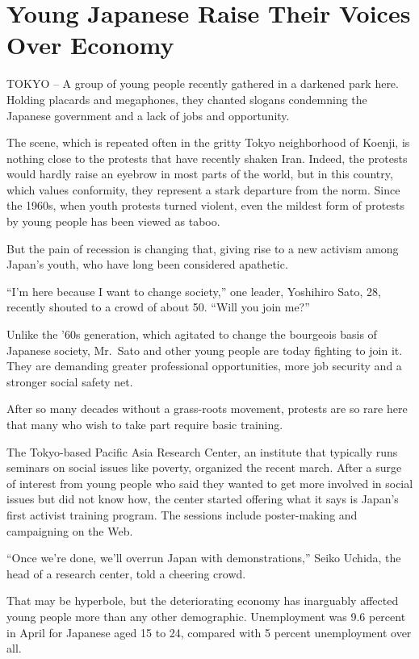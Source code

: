 ﻿\documentclass[12pt]{article}
\begin{document}
\section{Young Japanese Raise Their Voices Over Economy}

TOKYO -- A group of young people recently gathered in a darkened park here. Holding placards and
megaphones, they chanted slogans condemning the Japanese government and a lack of jobs and
opportunity.

The scene, which is repeated often in the gritty Tokyo neighborhood of Koenji, is nothing close to
the protests that have recently shaken Iran. Indeed, the protests would hardly raise an eyebrow in
most parts of the world, but in this country, which values conformity, they represent a stark
departure from the norm. Since the 1960s, when youth protests turned violent, even the mildest form
of protests by young people has been viewed as taboo.

But the pain of recession is changing that, giving rise to a new activism among Japan's youth, who
have long been considered apathetic.

``I'm here because I want to change society,'' one leader, Yoshihiro Sato, 28, recently shouted to a
crowd of about 50. ``Will you join me?''

Unlike the '60s generation, which agitated to change the bourgeois basis of Japanese society,
Mr.~Sato and other young people are today fighting to join it. They are demanding greater
professional opportunities, more job security and a stronger social safety net.

After so many decades without a grass-roots movement, protests are so rare here that many who wish
to take part require basic training.

The Tokyo-based Pacific Asia Research Center, an institute that typically runs seminars on social
issues like poverty, organized the recent march. After a surge of interest from young people who
said they wanted to get more involved in social issues but did not know how, the center started
offering what it says is Japan's first activist training program. The sessions include poster-making
and campaigning on the Web.

``Once we're done, we'll overrun Japan with demonstrations,'' Seiko Uchida, the head of a research
center, told a cheering crowd.

That may be hyperbole, but the deteriorating economy has inarguably affected young people more than
any other demographic. Unemployment was 9.6 percent in April for Japanese aged 15 to 24, compared
with 5 percent unemployment over all.
\end{document}
